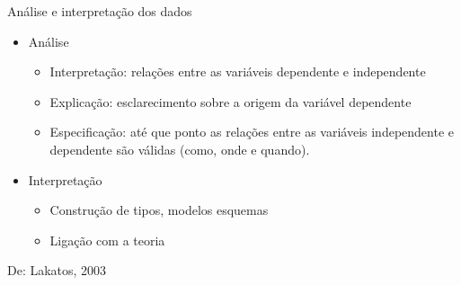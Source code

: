 \documentclass{beamer}
\begin{document}
\begin{frame}{Análise e interpretação dos dados}
  \begin{itemize}
  \item Análise
    \begin{itemize}
    \item Interpretação: relações entre as variáveis dependente e
      independente
    \item Explicação: esclarecimento sobre a origem da variável
      dependente
    \item Especificação: até que ponto as relações entre as variáveis
      independente e dependente são válidas (como, onde e quando).
    \end{itemize}
  \item Interpretação
    \begin{itemize}
    \item Construção de tipos, modelos esquemas
    \item Ligação com a teoria
    \end{itemize}
  \end{itemize}
  De: Lakatos, 2003
\end{frame}
\end{document}
